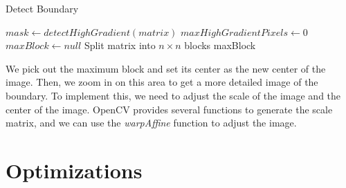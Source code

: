 \documentclass[11pt]{article}
\begin{document}
    \begin{algorithm}[H]
        \SetAlgoLined
        \caption{Detect Boundary}
        \label{alg:detect_boundary}
        $mask \leftarrow detectHighGradient(matrix)$\;
        $maxHighGradientPixels \leftarrow 0$\;
        $maxBlock \leftarrow null$\;
        Split matrix into $n \times n$ blocks\;
        \Return maxBlock\;
    \end{algorithm}

    We pick out the maximum block and set its center as the new center of the image.
    Then, we zoom in on this area to get a more detailed image of the boundary.
    To implement this, we need to adjust the scale of the image and the center of the image.
    OpenCV provides several functions to generate the scale matrix, and we can use the \textit{warpAffine}
    function to adjust the image.

    \section{Optimizations}\label{sec:optimizations}


    
    
\end{document}

